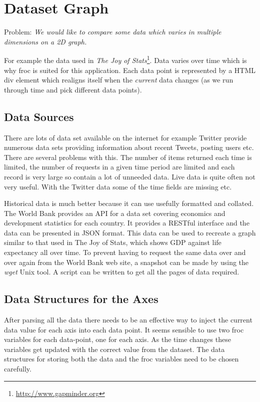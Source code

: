\section{Dataset Graph}
Problem: \emph{We would like to compare some data which varies in multiple dimensions on a 2D graph.}

For example the data used in \emph{The Joy of Stats}\footnote{\url{http://www.gapminder.org}}. Data varies over time which is why froc is suited for this application. Each data point is represented by a HTML div element which realigns itself when the \emph{current} data changes (as we run through time and pick different data points).

\subsection{Data Sources}
There are lots of data set available on the internet for example Twitter provide numerous data sets providing information about recent Tweets, posting users etc. There are several problems with this. The number of items returned each time is limited, the number of requests in a given time period are limited and each record is very large so contain a lot of unneeded data. Live data is quite often not very useful. With the Twitter data some of the time fields are missing etc.

Historical data is much better because it can use usefully formatted and collated. The World Bank provides an API for a data set covering economics and development statistics for each country. It provides a RESTful interface and the data can be presented in JSON format. This data can be used to recreate a graph similar to that used in The Joy of Stats, which shows GDP against life expectancy all over time. To prevent having to request the same data over and over again from the World Bank web site, a snapshot can be made by using the \emph{wget} Unix tool. A script can be written to get all the pages of data required.

\subsection{Data Structures for the Axes}
After parsing all the data there needs to be an effective way to inject the current data value for each axis into each data point. It seems sensible to use two froc variables for each data-point, one for each axis. As the time changes these variables get updated with the correct value from the dataset. The data structures for storing both the data and the froc variables need to be chosen carefully.

